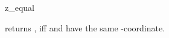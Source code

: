\begin{ccRefFunction}{z_equal}

         {returns , iff  and 
	  have the same -coordinate.}
\end{ccRefFunction}

